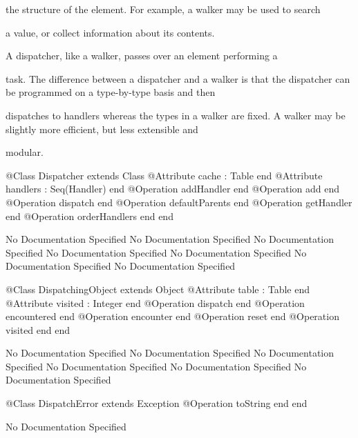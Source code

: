       the structure of the element. For example, a walker may be used to search

      a value, or collect information about its contents.

       A dispatcher, like a walker, passes over an element performing a

       task. The difference between a dispatcher and a walker is that 
       the dispatcher can be programmed on a type-by-type basis and then

       dispatches to handlers whereas the types in a walker are fixed.
       A walker may be slightly more efficient, but less extensible and

       modular.
\begin{Interface}
@Class Dispatcher extends Class
  @Attribute cache : Table end
  @Attribute handlers : Seq(Handler) end
  @Operation addHandler end
  @Operation add end
  @Operation dispatch end
  @Operation defaultParents end
  @Operation getHandler end
  @Operation orderHandlers end
end
\end{Interface}
No Documentation Specified
No Documentation Specified
No Documentation Specified
No Documentation Specified
No Documentation Specified
No Documentation Specified
No Documentation Specified
\begin{Interface}
@Class DispatchingObject extends Object
  @Attribute table : Table end
  @Attribute visited : Integer end
  @Operation dispatch end
  @Operation encountered end
  @Operation encounter end
  @Operation reset end
  @Operation visited end
end
\end{Interface}
No Documentation Specified
No Documentation Specified
No Documentation Specified
No Documentation Specified
No Documentation Specified
No Documentation Specified
\begin{Interface}
@Class DispatchError extends Exception
  @Operation toString end
end
\end{Interface}
No Documentation Specified

